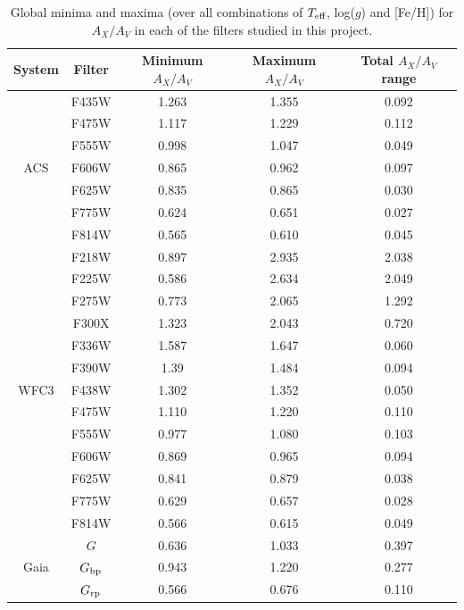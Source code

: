 \documentclass[12pt, a4paper]{report}
\begin{document}
\begin{table}
\begin{center}
\begin{tabular}{ccccc}
\hline
System & Filter & Minimum $A_{X}/A_{V}$ & Maximum $A_{X}/A_{V}$ & Total $A_{X}/A_{V}$ range \\
\hline
& F435W & 1.263 & 1.355 & 0.092 \\
& F475W & 1.117 & 1.229 & 0.112 \\
& F555W & 0.998 & 1.047 & 0.049 \\
ACS & F606W & 0.865 & 0.962 & 0.097 \\
& F625W & 0.835 & 0.865 & 0.030 \\
& F775W & 0.624 & 0.651 & 0.027 \\
& F814W & 0.565 & 0.610 & 0.045 \\
\hline
& F218W & 0.897 & 2.935 & 2.038 \\
& F225W & 0.586 & 2.634 & 2.049 \\
& F275W & 0.773 & 2.065 & 1.292 \\
& F300X & 1.323 & 2.043 & 0.720 \\
& F336W & 1.587 & 1.647 & 0.060 \\
& F390W & 1.39 & 1.484 & 0.094 \\
WFC3 & F438W & 1.302 & 1.352 & 0.050 \\
& F475W & 1.110 & 1.220 & 0.110 \\
& F555W & 0.977 & 1.080 & 0.103 \\
& F606W & 0.869 & 0.965 & 0.094 \\
& F625W & 0.841 & 0.879 & 0.038 \\
& F775W & 0.629 & 0.657 & 0.028 \\
& F814W & 0.566 & 0.615 & 0.049 \\
\hline
& $G$ & 0.636 & 1.033 & 0.397 \\
Gaia & $G_{\textnormal{bp}}$ & 0.943 & 1.220 & 0.277 \\
& $G_{\textnormal{rp}}$ & 0.566 & 0.676 & 0.110 \\
\hline

\end{tabular}
\caption{Global minima and maxima (over all combinations of $T_{\textnormal{eff}}$, log($g$) and [Fe/H]) for $A_{X}/A_{V}$ in each of the filters studied in this project.}
\label{filter_AxAv_ranges}
\end{center}
\end{table}
\end{document}
